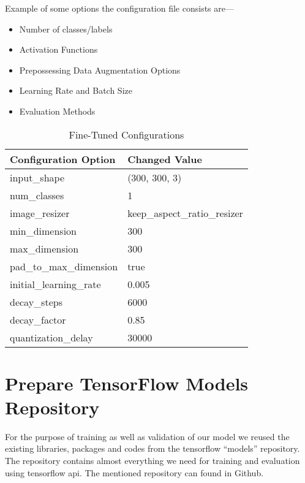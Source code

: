             Example of some options the configuration file consists are---
            \begin{itemize}
                \item {Number of classes/labels}
                \item {Activation Functions}
                \item {Prepossessing Data Augmentation Options}
                \item {Learning Rate and Batch Size}
                \item {Evaluation Methods}
            \end{itemize}
            \begin{table}
                \centering
                \begin{tabular}{|l|l|} \hline 
                     Configuration Option  &  Changed Value \\\hline\hline
                     input\_shape  &  (300, 300, 3) \\\hline
                     num\_classes  &  1 \\\hline
                     image\_resizer  &  keep\_aspect\_ratio\_resizer \\\hline
                     min\_dimension  &  300 \\\hline
                     max\_dimension  &  300 \\\hline
                     pad\_to\_max\_dimension  &  true \\\hline
                     initial\_learning\_rate  &  0.005 \\\hline
                     decay\_steps  &  6000 \\\hline
                     decay\_factor  &  0.85 \\\hline
                     quantization\_delay  &  30000 \\\hline
                \end{tabular}
                \caption{Fine-Tuned Configurations}
                \label{tab:fine_tuned_conf}
            \end{table}
    \section{Prepare TensorFlow Models Repository}
        For the purpose of training as well as validation of our model we reused the existing libraries, packages and codes from the \gls{tensorflow} ``models'' repository. The repository contains almost everything we need for training and evaluation using \gls{tensorflow} \acrshort{api}. The mentioned repository can found in Github.
        
